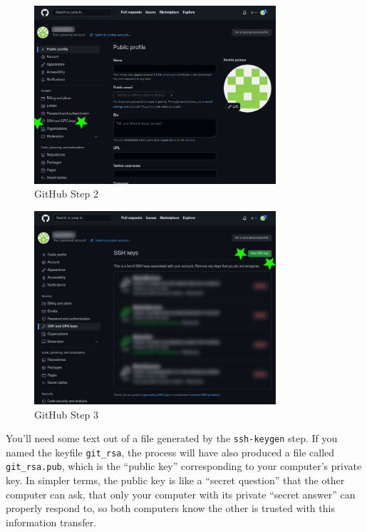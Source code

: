 \begin{figure}
\centering
\includegraphics[width=0.8\textwidth]{Images/GH_02.png}
\caption{GitHub Step 2}
\end{figure}
\FloatBarrier

\begin{figure}
\centering
\includegraphics[width=0.8\textwidth]{Images/GH_03.png}
\caption{GitHub Step 3}
\end{figure}
\FloatBarrier

You'll need some text out of a file generated by the \texttt{ssh-keygen}
step. If you named the keyfile \texttt{git\_rsa}, the process will have
also produced a file called \texttt{git\_rsa.pub}, which is the ``public
key'' corresponding to your computer's private key. In simpler terms,
the public key is like a ``secret question'' that the other computer can
ask, that only your computer with its private ``secret answer'' can
properly respond to, so both computers know the other is trusted with
this information transfer.

